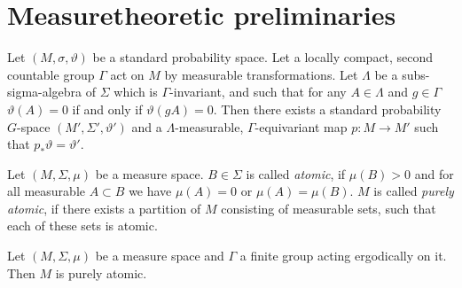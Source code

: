 \section{Measuretheoretic preliminaries}
\label{sec:measure}

\begin{thm}
  \label{thm:mackey}
  Let \((M, \sigma, \vartheta)\) be a standard probability space. Let a locally compact, second countable group \(\Gamma\) act on \(M\) by measurable transformations. Let \(\Lambda\) be a subs-sigma-algebra of \(\Sigma\) which is \(\Gamma\)-invariant, and such that for any \(A \in \Lambda\) and \(g \in \Gamma\) \(\vartheta(A) = 0 \) if and only if \(\vartheta(gA) = 0\). Then there exists a standard probability \(G\)-space \((M', \Sigma', \vartheta')\) and a \(\Lambda\)-measurable, \(\Gamma\)-equivariant map \(p \colon M \to M'\) such that \(p_\ast \vartheta = \vartheta'\).
\end{thm}

\begin{defin}
  Let \((M, \Sigma, \mu)\) be a measure space. \(B \in \Sigma\) is called \emph{atomic}, if \(\mu(B) > 0\) and for all measurable \(A \subset B\) we have \(\mu(A) = 0\) or \(\mu(A) = \mu(B)\). \(M\) is called \emph{purely atomic}, if there exists a partition of \(M\) consisting of measurable sets, such that each of these sets is atomic.
\end{defin}

\begin{lemma}
  \label{lem:ergodic-atomic}
  Let \((M, \Sigma, \mu)\) be a measure space and \(\Gamma\) a finite group acting ergodically on it. Then \(M\) is purely atomic.
\end{lemma}

